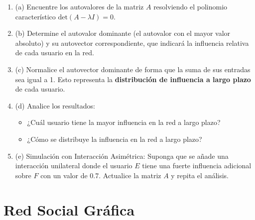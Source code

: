 \documentclass{article}
\begin{document}
\begin{enumerate}
    \item (a) Encuentre los autovalores de la matriz \( A \) resolviendo el polinomio característico \(\text{det}(A - \lambda I) = 0\).

    \item (b) Determine el autovalor dominante (el autovalor con el mayor valor absoluto) y su autovector correspondiente, que indicará la influencia relativa de cada usuario en la red.

    \item (c) Normalice el autovector dominante de forma que la suma de sus entradas sea igual a 1. Esto representa la \textbf{distribución de influencia a largo plazo} de cada usuario.

    \item (d) Analice los resultados:
    \begin{itemize}
        \item ¿Cuál usuario tiene la mayor influencia en la red a largo plazo?
        \item ¿Cómo se distribuye la influencia en la red a largo plazo?
    \end{itemize}

    \item (e) Simulación con Interacción Asimétrica: Suponga que se añade una interacción unilateral donde el usuario \( E \) tiene una fuerte influencia adicional sobre \( F \) con un valor de 0.7. Actualice la matriz \( A \) y repita el análisis.
\end{enumerate}


\section*{Red Social Gráfica}
\end{document}
